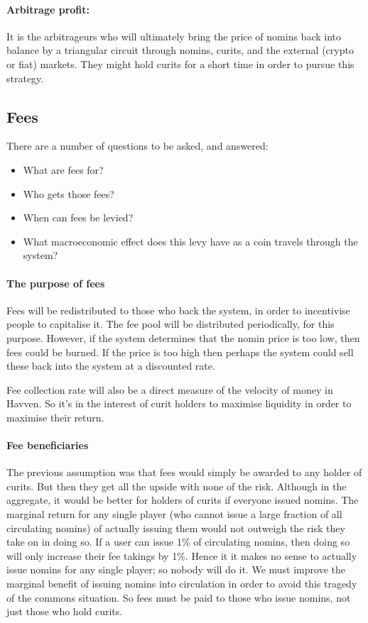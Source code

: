 \documentclass{article}
\begin{document}
\paragraph{Arbitrage profit:}
It is the arbitrageurs who will ultimately bring the price of nomins back into balance by a triangular circuit
through nomins, curits, and the external (crypto or fiat) markets. They might hold curits for a short time in order
to pursue this strategy.


\pagebreak
\subsection{Fees}
There are a number of questions to be asked, and answered:
\begin{itemize}
    \item What are fees for?
    \item Who gets those fees?
    \item When can fees be levied?
    \item What macroeconomic effect does this levy have as a coin travels through the system?
\end{itemize}

\paragraph{The purpose of fees}
Fees will be redistributed to those who back the system, in order to incentivise people to capitalise it.
The fee pool will be distributed periodically, for this purpose.
However, if the system determines that the nomin price is too low, then fees could be burned. If the price is
too high then perhaps the system could sell these back into the system at a discounted rate.

Fee collection rate will also be a direct measure of the velocity of money in Havven. So it's in the interest
of curit holders to maximise liquidity in order to maximise their return.

\paragraph{Fee beneficiaries}
The previous assumption was that fees would simply be awarded to any holder of curits. But then they
get all the upside with none of the risk. Although in the aggregate, it would be better for holders of 
curits if everyone issued nomins. The marginal return for any single player (who cannot issue a 
large fraction of all circulating nomins) of actually issuing them would not outweigh the risk they take
on in doing so. If a user can issue 1\% of circulating nomins, then doing so will only increase their
fee takings by 1\%.
Hence it it makes no sense to actually issue nomins for any single player; so nobody will do it.
We must improve the marginal benefit of issuing nomins into circulation in order to avoid
this tragedy of the commons situation. So fees must be paid to those who issue nomins, not just
those who hold curits.
\end{document}
